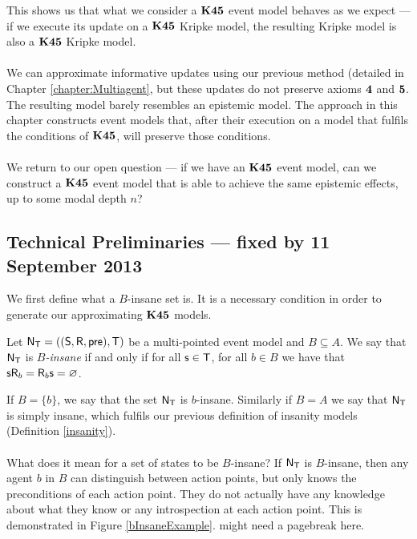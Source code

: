 This shows us that what we consider a $\bf K45$ event model behaves as we expect --- if we execute
its update on a $\bf K45$ Kripke model, the resulting Kripke model is also a $\bf K45$ Kripke model.\\
\\
We can approximate informative updates using our previous method (detailed in Chapter
\ref{chapter:Multiagent}, but these updates do not preserve
axioms $\bf 4$ and $\bf 5$.
The resulting model barely resembles an epistemic model.
The approach in this chapter constructs event models that, after their execution on a model that
fulfils the conditions of $\bf K45$, will preserve those conditions.\\
\\
We return to our open question --- if we have an $\bf K45$ event model, can we construct a $\bf K45$ event
model that is able to achieve the same epistemic effects, up to some modal depth $n$?

\subsection{Technical Preliminaries --- fixed by 11 September 2013}

We first define what a $B$-insane set is.
It is a necessary condition in order to generate our approximating $\bf K45$ models.

\begin{defn} \label{binsane}
	Let $\mathrm{\mathsf{N}}_\mathrm{\mathsf{T}} = ((\mathrm{\mathsf{S}}, \mathrm{\mathsf{R}}, \mathrm{\mathsf{pre}}), \mathrm{\mathsf{T}})$ be a multi-pointed event model and $B \subseteq A$.
	We say that $\mathrm{\mathsf{N}}_\mathrm{\mathsf{T}}$ is {\em $B$-insane} if and only if for all $\mathrm{\mathsf{s}} \in \mathrm{\mathsf{T}}$,
	for all $b \in B$ we have that $\mathrm{\mathsf{s}} \mathrm{\mathsf{R}}_b = \mathrm{\mathsf{R}}_b \mathrm{\mathsf{s}} = \varnothing$.
\end{defn}

If $B = \{b\}$, we say that the set $\mathrm{\mathsf{N}}_\mathrm{\mathsf{T}}$ is $b$-insane.
Similarly if $B = A$ we say that $\mathrm{\mathsf{N}}_\mathrm{\mathsf{T}}$ is simply insane, which fulfils
our previous definition of insanity models (Definition \ref{insanity}).\\
\\
What does it mean for a set of states to be $B$-insane?
If $\mathrm{\mathsf{N}}_\mathrm{\mathsf{T}}$ is $B$-insane, then any agent $b$ in $B$ can distinguish between
action points, but only knows the preconditions of each action point.
They do not actually have any knowledge about what they know or any
introspection at each action point.
This is demonstrated in Figure \ref{bInsaneExample}.
\FIXME might need a pagebreak here.

